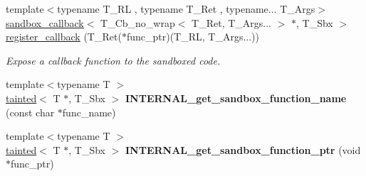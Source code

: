 \begin{DoxyCompactItemize}
{\footnotesize template$<$typename T\+\_\+\+RL , typename T\+\_\+\+Ret , typename... T\+\_\+\+Args$>$ }\\\hyperlink{classrlbox_1_1sandbox__callback}{sandbox\+\_\+callback}$<$ T\+\_\+\+Cb\+\_\+no\+\_\+wrap$<$ T\+\_\+\+Ret, T\+\_\+\+Args... $>$ $\ast$, T\+\_\+\+Sbx $>$ \hyperlink{classrlbox_1_1rlbox__sandbox_ae4f4cc7825bcb613ab5405e0f6cae7f3}{register\+\_\+callback} (T\+\_\+\+Ret($\ast$func\+\_\+ptr)(T\+\_\+\+RL, T\+\_\+\+Args...))
\begin{DoxyCompactList}\small\item\em Expose a callback function to the sandboxed code. \end{DoxyCompactList}\item 
\mbox{\label{classrlbox_1_1rlbox__sandbox_ad65b42ed5e903655cc23cc9e33672b16}} 
{\footnotesize template$<$typename T $>$ }\\\hyperlink{classrlbox_1_1tainted}{tainted}$<$ T $\ast$, T\+\_\+\+Sbx $>$ {\bfseries I\+N\+T\+E\+R\+N\+A\+L\+\_\+get\+\_\+sandbox\+\_\+function\+\_\+name} (const char $\ast$func\+\_\+name)
\item 
\mbox{\label{classrlbox_1_1rlbox__sandbox_a912906aabd93bf8358153b7a4c7e0adc}} 
{\footnotesize template$<$typename T $>$ }\\\hyperlink{classrlbox_1_1tainted}{tainted}$<$ T $\ast$, T\+\_\+\+Sbx $>$ {\bfseries I\+N\+T\+E\+R\+N\+A\+L\+\_\+get\+\_\+sandbox\+\_\+function\+\_\+ptr} (void $\ast$func\+\_\+ptr)
\end{DoxyCompactItemize}
